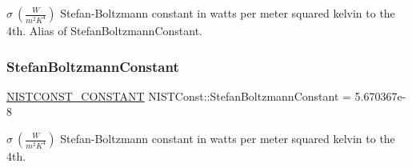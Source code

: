 $\sigma \ (\frac{W}{m^2 K^4})$ Stefan-\/\+Boltzmann constant in watts per meter squared kelvin to the 4th. Alias of Stefan\+Boltzmann\+Constant. \mbox{\label{group___n_i_s_t_const-_stefan_boltzmann_constant_ga7a87fa5e9ed3db503ee24f828d1dc700}} 
\subsubsection{\texorpdfstring{Stefan\+Boltzmann\+Constant}{StefanBoltzmannConstant}}
{\footnotesize\ttfamily \mbox{\hyperlink{group___n_i_s_t_const-_macros_ga2b0fc1d7452373f816175dd86ce26729}{N\+I\+S\+T\+C\+O\+N\+S\+T\+\_\+\+C\+O\+N\+S\+T\+A\+NT}} N\+I\+S\+T\+Const\+::\+Stefan\+Boltzmann\+Constant = 5.\+670367e-\/8}

$\sigma \ (\frac{W}{m^2 K^4})$ Stefan-\/\+Boltzmann constant in watts per meter squared kelvin to the 4th. 